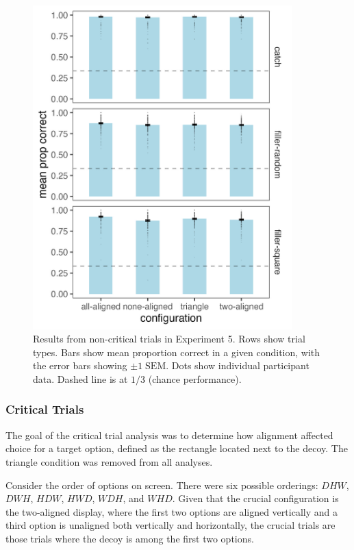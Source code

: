 \begin{figure}
   \includegraphics[width=100mm]{figures/non_crit_mean_prop_correct.jpeg}
   \caption{Results from non-critical trials in Experiment 5. Rows show trial types. Bars show mean proportion correct in a given condition, with the error bars showing $\pm1\;\text{SEM}$. Dots show individual participant data. Dashed line is at $1/3$ (chance performance).}
   \label{fig:comparability_non_crit_mean_prop_correct}
\end{figure}

\subsubsection{Critical Trials}

The goal of the critical trial analysis was to determine how alignment affected choice for a target option, defined as the rectangle located next to the decoy. The triangle condition was removed from all analyses.

Consider the order of options on screen. There were six possible orderings: $DHW$, $DWH$, $HDW$, $HWD$, $WDH$, and $WHD$. Given that the crucial configuration is the two-aligned display, where the first two options are aligned vertically and a third option is unaligned both vertically and horizontally, the crucial trials are those trials where the decoy is among the first two options. 

